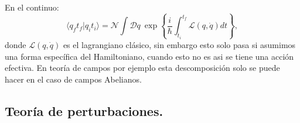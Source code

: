 En el continuo:
\begin{equation}
\langle q_{f}t_{f}|q_it_i\rangle=\mathcal{N}\int\mathcal{D}q\ \exp\left\{ \frac{i}{\hbar}\int_{t_{i}}^{t_{f}}\mathcal{L}(q,\dot{q})dt\right\} ,
\end{equation}
donde $\mathcal{L}(q,\dot{q})$ es el lagrangiano clásico, sin embargo esto solo pasa si asumimos una forma específica del Hamiltoniano, cuando esto no es asi se tiene una acción efectiva. En teoría de campos por ejemplo esta descomposición solo se puede hacer en el caso de campos Abelianos.
 
 

\subsection{Teoría de perturbaciones.}

